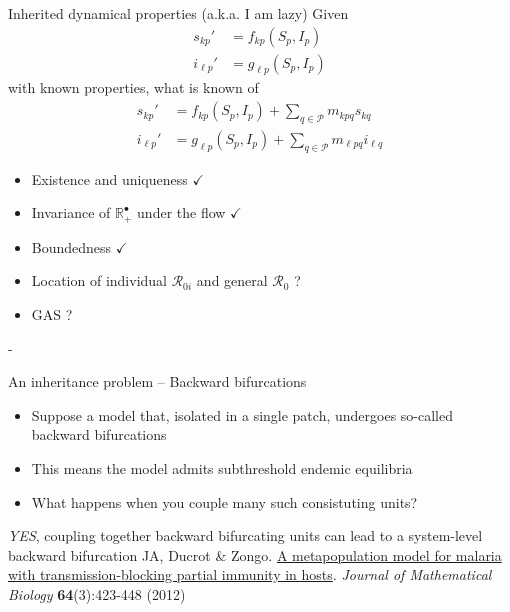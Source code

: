\documentclass[aspectratio=169]{beamer}\usepackage[]{graphicx}\usepackage[]{xcolor}
\begin{document}
\begin{frame}{Inherited dynamical properties (a.k.a. I am lazy)}
	Given
	\begin{subequations}
		\begin{align}
			s_{kp}' &= f_{kp}(S_p,I_p) \label{sys:generic_intra_ds} \\
			i_{\ell p}' &= g_{\ell p}(S_p,I_p) \label{sys:generic_intra_di}
		\end{align}				
	\end{subequations}
	with known properties, what is known of
	\begin{subequations}
		\begin{align}
			s_{kp}' &= f_{kp}(S_p,I_p)+\textstyle{\sum_{q\in\mathcal{P}}} m_{kpq}s_{kq} 
			\label{sys:generic_inter_ds} \\
			i_{\ell p}' &= g_{\ell p}(S_p,I_p)+\textstyle{\sum_{q\in\mathcal{P}}} m_{\ell pq}i_{\ell q}
			\label{sys:generic_inter_di}
		\end{align}				
	\end{subequations}
	\begin{itemize}
		\item Existence and uniqueness $\checkmark$
		\item Invariance of $\mathbb{R}_+^\bullet$ under the flow $\checkmark$
		\item Boundedness $\checkmark$
		\item Location of individual $\mathcal{R}_{0i}$ and general $\mathcal{R}_0$ ?
		\item GAS ?		
	\end{itemize}
	- 
\end{frame}

\begin{frame}{An inheritance problem -- Backward bifurcations}
	\begin{itemize}
		\item Suppose a model that, isolated in a single patch, undergoes so-called backward bifurcations
		\item This means the model admits subthreshold endemic equilibria
		\item What happens when you couple many such consistuting units?
	\end{itemize}
	\vfill
	\emph{YES}, coupling together backward bifurcating units can lead to a system-level backward bifurcation
	\vfill
	JA, Ducrot \& Zongo. \href{https://julien-arino.github.io/assets/pdf/papers/2012_ArinoDucrotZongo-JMB64.pdf}{A metapopulation model for malaria with transmission-blocking partial immunity in hosts}. \emph{Journal of Mathematical Biology} \textbf{64}(3):423-448 (2012) 		
\end{frame}
\end{document}
